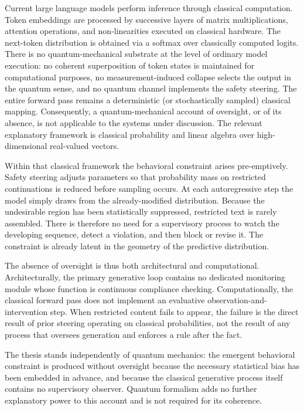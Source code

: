 Current large language models perform inference through classical computation. Token embeddings are processed by successive layers of matrix multiplications, attention operations, and non-linearities executed on classical hardware. The next-token distribution is obtained via a softmax over classically computed logits. There is no quantum-mechanical substrate at the level of ordinary model execution: no coherent superposition of token states is maintained for computational purposes, no measurement-induced collapse selects the output in the quantum sense, and no quantum channel implements the safety steering. The entire forward pass remains a deterministic (or stochastically sampled) classical mapping. Consequently, a quantum-mechanical account of oversight, or of its absence, is not applicable to the systems under discussion. The relevant explanatory framework is classical probability and linear algebra over high-dimensional real-valued vectors.

Within that classical framework the behavioral constraint arises pre-emptively. Safety steering adjusts parameters so that probability mass on restricted continuations is reduced before sampling occurs. At each autoregressive step the model simply draws from the already-modified distribution. Because the undesirable region has been statistically suppressed, restricted text is rarely assembled. There is therefore no need for a supervisory process to watch the developing sequence, detect a violation, and then block or revise it. The constraint is already latent in the geometry of the predictive distribution.

The absence of oversight is thus both architectural and computational. Architecturally, the primary generative loop contains no dedicated monitoring module whose function is continuous compliance checking. Computationally, the classical forward pass does not implement an evaluative observation-and-intervention step. When restricted content fails to appear, the failure is the direct result of prior steering operating on classical probabilities, not the result of any process that oversees generation and enforces a rule after the fact.

The thesis stands independently of quantum mechanics: the emergent behavioral constraint is produced without oversight because the necessary statistical bias has been embedded in advance, and because the classical generative process itself contains no supervisory observer. Quantum formalism adds no further explanatory power to this account and is not required for its coherence.

